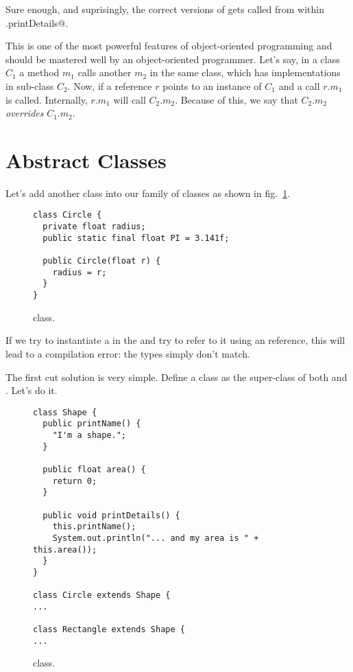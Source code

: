 \documentclass[12pt,a4paper]{article}
\begin{document}
Sure enough, and suprisingly, the correct versions of \lstinline@printName@ gets called from within \lstinline@Rectangle.printDetails@.

This is one of the most powerful features of object-oriented programming and should be mastered well by an object-oriented programmer. Let's say, in a class $C_1$ a method $m_1$ calls another $m_2$ in the same class, which has implementations in sub-class $C_2$. Now, if a reference $r$ points to an instance of $C_1$ and a call $r.m_1$ is called. Internally, $r.m_1$ will call $C_2.m_2$. Because of this, we say that $C_2.m_2$ \emph{overrides} $C_1.m_2$.

\section{Abstract Classes}
Let's add another class \lstinline@Circle@ into our family of classes as shown in fig.~\ref{f:cir1}.
\begin{figure}[H]
\begin{lstlisting}[frame=single]
class Circle {
  private float radius;
  public static final float PI = 3.141f;

  public Circle(float r) {
    radius = r;
  }
}
\end{lstlisting}
\caption{\lstinline@Circle@ class.}
\label{f:cir1}
\end{figure}

If we try to instantiate a \lstinline@Circle@ in the \lstinline@main@ and try to refer to it using an \lstinline@Rectangle@ reference, this will lead to a compilation error: the types simply don't match.

The first cut solution is very simple. Define a class \lstinline@Shape@ as the super-class of both \lstinline@Circle@ and \lstinline@Rectangle@. Let's do it.
\begin{figure}[H]
\begin{lstlisting}[frame=single]
class Shape {
  public printName() {
    "I'm a shape.";
  }

  public float area() {
    return 0;
  }

  public void printDetails() {
    this.printName();
    System.out.println("... and my area is " + this.area());
  }
}

class Circle extends Shape {
...

class Rectangle extends Shape {
...
\end{lstlisting}
\caption{\lstinline@Circle@ class.}
\label{f:sh1}
\end{figure}
\end{document}
